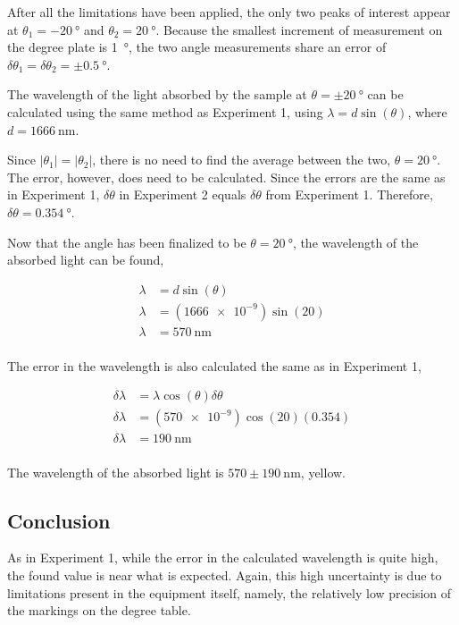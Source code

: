 \documentclass{article}
\begin{document}
\qq After all the limitations have been applied, the only two peaks of interest
appear at \(\theta_1 = \SI{-20}{\degree}\) and \(\theta_2 =
\SI{20}{\degree}\). Because the smallest increment of measurement on the degree
plate is \SI{1}{\degree}, the two angle measurements share an error of
\(\delta\theta_1 = \delta\theta_2 = \pm \SI{0.5}{\degree}\). 

\qq The wavelength of the light absorbed by the sample at \(\theta = \pm
\SI{20}{\degree}\) can be calculated using the same method as Experiment 1,
using \(\lambda = d \sin{(\theta)}\), where \(d = \SI{1666}{\nano\meter}\). 

\qq Since \(|\theta_1| = |\theta_2|\), there is no need to find the average
between the two, \(\theta = \SI{20}{\degree}\). The error, however, does need to
be calculated. Since the errors are the same as in Experiment 1,
\(\delta\theta\) in Experiment 2 equals \(\delta\theta\) from Experiment
1. Therefore, \(\delta\theta = \SI{0.354}{\degree}\).

\qq Now that the angle has been finalized to be \(\theta = \SI{20}{\degree}\),
the wavelength of the absorbed light can be found,

\begin{align*}
  \lambda &= d \sin{(\theta)} \\
  \lambda &= (\num{1666e-9}) \sin{(20)} \\
  \lambda &= \SI{570}{\nano\meter} \\
\end{align*}

The error in the wavelength is also calculated the same as in Experiment 1,

\begin{align*}
  \delta\lambda &= \lambda \cos{(\theta)} \delta\theta \\
  \delta\lambda &= (\num{570e-9}) \cos{(20)} (0.354) \\
  \delta\lambda &= \SI{190}{\nano\meter} \\
\end{align*}

The wavelength of the absorbed light is \(570 \pm \SI{190}{\nano\meter}\),
yellow.

\subsection{Conclusion}

\qq As in Experiment 1, while the error in the calculated wavelength is quite
high, the found value is near what is expected. Again, this high uncertainty is
due to limitations present in the equipment itself, namely, the relatively low
precision of the markings on the degree table.

\end{document}
